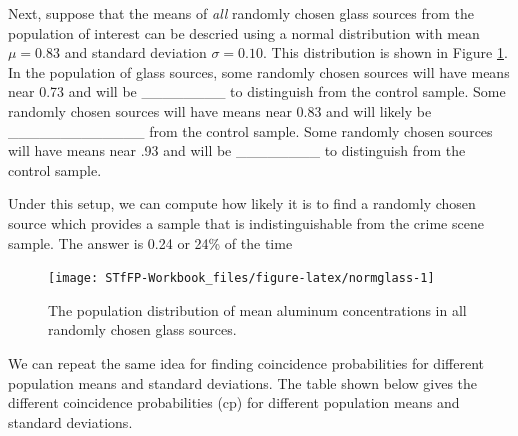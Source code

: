 \documentclass[]{book}
\theoremstyle{definition}
\theoremstyle{definition}
\theoremstyle{remark}
\begin{document}
Next, suppose that the means of \emph{all} randomly chosen glass sources
from the population of interest can be descried using a normal
distribution with mean \(\mu = 0.83\) and standard deviation
\(\sigma = 0.10\). This distribution is shown in Figure
\ref{fig:normglass}. In the population of glass sources, some randomly
chosen sources will have means near 0.73 and will be \_\_\_\_\_\_\_\_ to
distinguish from the control sample. Some randomly chosen sources will
have means near 0.83 and will likely be \_\_\_\_\_\_\_\_\_\_\_\_\_ from
the control sample. Some randomly chosen sources will have means near
.93 and will be \_\_\_\_\_\_\_\_ to distinguish from the control sample.

Under this setup, we can compute how likely it is to find a randomly
chosen source which provides a sample that is indistinguishable from the
crime scene sample. The answer is 0.24 or 24\% of the time

\begin{figure}[h]

{\centering \texttt{[image: STfFP-Workbook\_files/figure-latex/normglass-1]} 

}

\caption{The population distribution of mean aluminum concentrations in all randomly chosen glass sources.}\label{fig:normglass}
\end{figure}

We can repeat the same idea for finding coincidence probabilities for
different population means and standard deviations. The table shown
below gives the different coincidence probabilities (cp) for different
population means and standard deviations.
\end{document}
